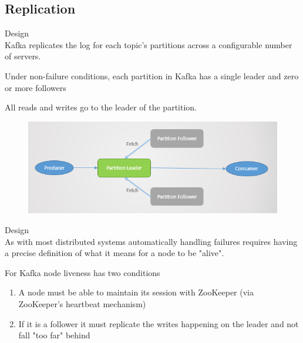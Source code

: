 \subsection{Replication}
\begin{frame}[plain,t]{Design} %
     \\
    \vspace{2ex}
    Kafka replicates the log for each topic's partitions across a configurable number of servers.
    
    \vspace{2ex}
    Under non-failure conditions, each partition in Kafka has a single leader and zero or more followers
    
     \vspace{2ex}
    All reads and writes go to the leader of the partition.
    
    \begin{figure}
        \centering
        \includegraphics[width=0.9\linewidth]{image/0210}
        \label{fig:0210}
    \end{figure}
    
    

\end{frame}
\begin{frame}[plain,t]{Design} %
     \\
    \vspace{2ex}
    As with most distributed systems automatically handling failures requires having a precise definition of what it means for a node to be "alive". 
    
    \vspace{2ex}
    For Kafka node liveness has two conditions
    \begin{enumerate}
        \item  A node must be able to maintain its session with ZooKeeper (via ZooKeeper's heartbeat mechanism)
        \item If it is a follower it must replicate the writes happening on the leader and not fall "too far" behind
    \end{enumerate}
   
    
    
    
    
\end{frame}
